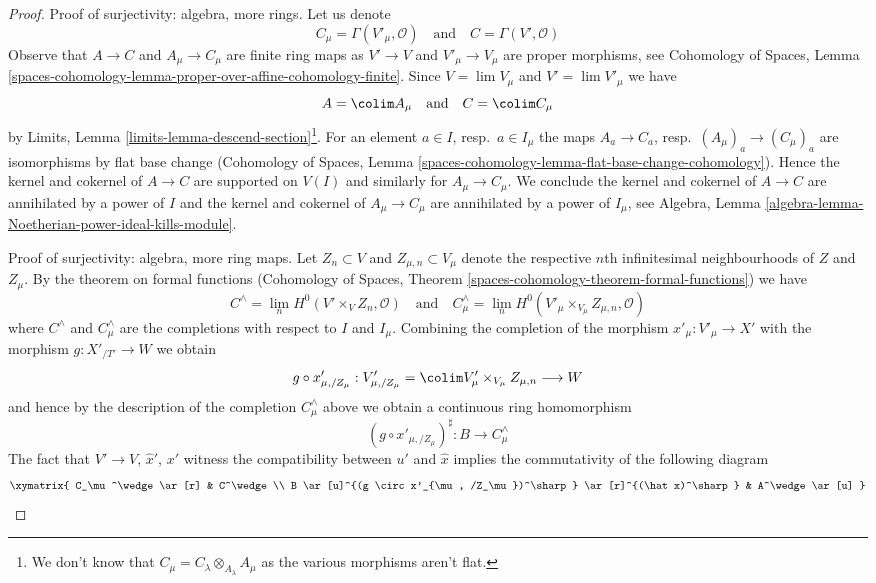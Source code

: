\begin{proof}
\medskip\noindent
Proof of surjectivity: algebra, more rings.
Let us denote
$$
C_\mu = \Gamma(V'_\mu, \mathcal{O})
\quad\text{and}\quad
C = \Gamma(V', \mathcal{O})
$$
Observe that $A \to C$ and $A_\mu \to C_\mu$ are finite ring maps as
$V' \to V$ and $V'_\mu \to V_\mu$ are proper morphisms, see
Cohomology of Spaces, Lemma
\ref{spaces-cohomology-lemma-proper-over-affine-cohomology-finite}.
Since $V = \lim V_\mu$ and $V' = \lim V'_\mu$
we have
$$
A = \colim A_\mu
\quad\text{and}\quad
C = \colim C_\mu
$$
by Limits, Lemma \ref{limits-lemma-descend-section}\footnote{We don't
know that $C_\mu = C_\lambda \otimes_{A_\lambda} A_\mu$ as the
various morphisms aren't flat.}. For an element
$a \in I$, resp.\ $a \in I_\mu$ the maps $A_a \to C_a$,
resp.\ $(A_\mu)_a \to (C_\mu)_a$ are isomorphisms by flat base change
(Cohomology of Spaces, Lemma
\ref{spaces-cohomology-lemma-flat-base-change-cohomology}).
Hence the kernel and cokernel of $A \to C$ are supported
on $V(I)$ and similarly for $A_\mu \to C_\mu$.
We conclude the kernel and cokernel of $A \to C$
are annihilated by a power of $I$ and the kernel and cokernel of
$A_\mu \to C_\mu$ are annihilated by a power of $I_\mu$, see
Algebra, Lemma \ref{algebra-lemma-Noetherian-power-ideal-kills-module}.

\medskip\noindent
Proof of surjectivity: algebra, more ring maps.
Let $Z_n \subset V$ and $Z_{\mu, n} \subset V_\mu$ denote
the respective $n$th infinitesimal neighbourhoods of $Z$ and $Z_\mu$.
By the theorem on formal functions
(Cohomology of Spaces, Theorem
\ref{spaces-cohomology-theorem-formal-functions})
we have
$$
C^\wedge = \lim_n H^0(V' \times_V Z_n, \mathcal{O})
\quad\text{and}\quad
C_\mu^\wedge =
\lim_n H^0(V'_\mu \times_{V_\mu} Z_{\mu, n}, \mathcal{O})
$$
where $C^\wedge$ and $C_\mu^\wedge$ are the completions with
respect to $I$ and $I_\mu$.
Combining the completion of the morphism
$x'_\mu : V'_\mu \to X'$ with the morphism $g : X'_{/T'} \to W$ we obtain
$$
g \circ x'_{\mu, /Z_\mu} :
V'_{\mu, /Z_\mu} = \colim V_\mu' \times_{V_\mu} Z_{\mu, n}
\longrightarrow
W
$$
and hence by the description of the completion
$C_\mu^\wedge$ above we obtain a continuous ring homomorphism
$$
(g \circ x'_{\mu, /Z_\mu})^\sharp : B \longrightarrow C_\mu^\wedge
$$
The fact that $V' \to V$, $\hat x'$, $x'$ witness the compatibility
between $u'$ and $\hat x$ implies the
commutativity of the following diagram
$$
\xymatrix{
C_\mu^\wedge \ar[r] &
C^\wedge \\
B \ar[u]^{(g \circ x'_{\mu, /Z_\mu})^\sharp} \ar[r]^{(\hat x)^\sharp} &
A^\wedge \ar[u]
}
$$


\end{proof}
